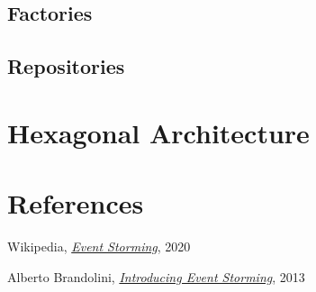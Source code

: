 \subsection{Factories}

\subsection{Repositories}

\section{Hexagonal Architecture}

\section{References} \label{chp2references}

\begin{thebibliography}{9}

Wikipedia,
\href{https://en.wikipedia.org/wiki/Event_storming}{\textit{Event Storming}}, 
2020

Alberto Brandolini,
\href{http://ziobrando.blogspot.com/2013/11/introducing-event-storming.html}{\textit{Introducing Event Storming}}, 
2013

\end{thebibliography}
